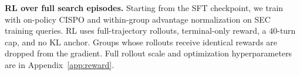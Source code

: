 \documentclass{article}
\begin{document}
\textbf{RL over full search episodes.}
Starting from the SFT checkpoint, we train with on-policy CISPO
\citep{cispo2025,scalerl2025} and within-group advantage normalization on SEC
training queries. RL uses full-trajectory rollouts, terminal-only reward, a
$40$-turn cap, and no KL anchor. Groups whose rollouts receive identical
rewards are dropped from the gradient. Full rollout scale and optimization
hyperparameters are in Appendix~\ref{app:reward}.
\end{document}
